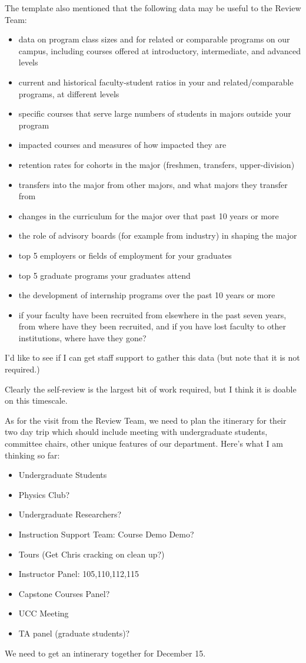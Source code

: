 \documentclass[12pt]{article}
\begin{document}
The template also mentioned that the following data may be useful to the Review Team:
\begin{itemize}
\item data on program class sizes and for related or comparable programs on our campus, including courses offered at introductory, intermediate, and advanced levels
\item current and historical faculty-student ratios in your and related/comparable programs, at different levels
\item specific courses that serve large numbers of students in majors outside your program
\item impacted courses and measures of how impacted they are
\item retention rates for cohorts in the major (freshmen, transfers, upper-division)
\item transfers into the major from other majors, and what majors they transfer from
\item changes in the curriculum for the major over that past 10 years or more
\item the role of advisory boards (for example from industry) in shaping the major
\item top 5 employers or fields of employment for your graduates
\item top 5 graduate programs your graduates attend
\item the development of internship programs over the past 10 years or more
\item if your faculty have been recruited from elsewhere in the past seven years, from where have they been recruited, and if you have lost faculty to other institutions, where have they gone?
\end{itemize}
I'd like to see if I can get staff support to gather this data (but note that it is not required.)

Clearly the self-review is the largest bit of work required, but I think it is doable on this timescale.

As for the visit from the Review Team, we need to plan the itinerary for their two day trip which should include meeting with undergraduate students, committee chairs, other unique features of our department.  Here's what I am thinking so far:
\begin{itemize}
\item Undergraduate Students
\item Physics Club?
\item Undergraduate Researchers?
\item Instruction Support Team:  Course Demo Demo?
\item Tours (Get Chris cracking on clean up?)
\item Instructor Panel: 105,110,112,115
\item Capstone Courses Panel?
\item UCC Meeting
\item TA panel (graduate students)?
\end{itemize}
We need to get an intinerary together for December 15.
\end{document}
